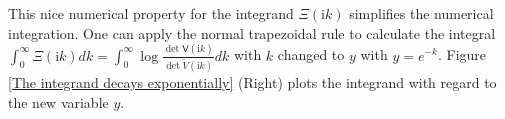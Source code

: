 This nice numerical property for the integrand $\Xi(\mathrm{i}k)$  simplifies the numerical integration. One can apply the normal trapezoidal rule to calculate the integral 
$\int_{0}^{\infty}\Xi(\mathrm{i}k)dk = \int_{0}^{\infty}\log\frac{\det\mathsf{V}(\mathrm{i}k)}{\det\tilde{V}(\mathrm{i}k)}dk$ with $k$ changed to $y$ with $y = e^{-k}$. 
Figure \ref{The integrand decays exponentially} (Right) plots the integrand with regard to the new variable $y$.



